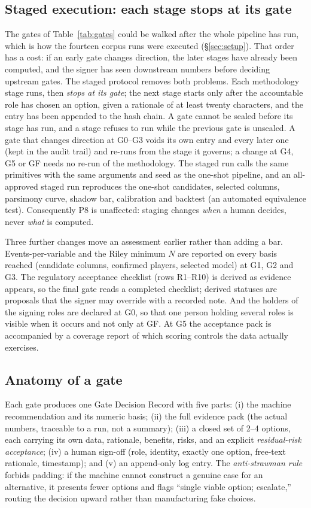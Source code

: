 \documentclass[9pt,journal]{IEEEtai}
\begin{document}
\subsection{Staged execution: each stage stops at its gate}\label{sec:staged}
The gates of Table~\ref{tab:gates} could be walked after the whole pipeline has run, which is how the
fourteen corpus runs were executed (\S\ref{sec:setup}). That order has a cost: if an early gate changes
direction, the later stages have already been computed, and the signer has seen downstream numbers
before deciding upstream gates. The staged protocol removes both problems. Each methodology stage
runs, then \emph{stops at its gate}; the next stage starts only after the accountable role has chosen
an option, given a rationale of at least twenty characters, and the entry has been appended to the hash
chain. A gate cannot be sealed before its stage has run, and a stage refuses to run while the previous
gate is unsealed. A gate that changes direction at G0--G3 voids its own entry and every later one (kept
in the audit trail) and re-runs from the stage it governs; a change at G4, G5 or GF needs no re-run of the
methodology. The staged run calls the same primitives with the same arguments and seed as the one-shot
pipeline, and an all-approved staged run reproduces the one-shot candidates, selected columns, parsimony
curve, shadow bar, calibration and backtest (an automated equivalence test). Consequently P8 is unaffected:
staging changes \emph{when} a human decides, never \emph{what} is computed.

Three further changes move an assessment earlier rather than adding a bar. Events-per-variable and the
Riley minimum $N$ are reported on every basis reached (candidate columns, confirmed players, selected
model) at G1, G2 and G3. The regulatory acceptance checklist (rows R1--R10) is derived as evidence
appears, so the final gate reads a completed checklist; derived statuses are proposals that the signer
may override with a recorded note. And the holders of the signing roles are declared at G0, so that one
person holding several roles is visible when it occurs and not only at GF. At G5 the acceptance pack is
accompanied by a coverage report of which scoring controls the data actually exercises.

\subsection{Anatomy of a gate}
Each gate produces one Gate Decision Record with five parts: (i) the machine recommendation and
its numeric basis; (ii) the full evidence pack (the actual numbers, traceable to a run, not a
summary); (iii) a closed set of 2--4 options, each carrying its own data, rationale, benefits,
risks, and an explicit \emph{residual-risk acceptance}; (iv) a human sign-off (role, identity,
exactly one option, free-text rationale, timestamp); and (v) an append-only log entry. The
\emph{anti-strawman rule} forbids padding: if the machine cannot construct a genuine case for an
alternative, it presents fewer options and flags ``single viable option; escalate,'' routing the
decision upward rather than manufacturing fake choices.
\end{document}
